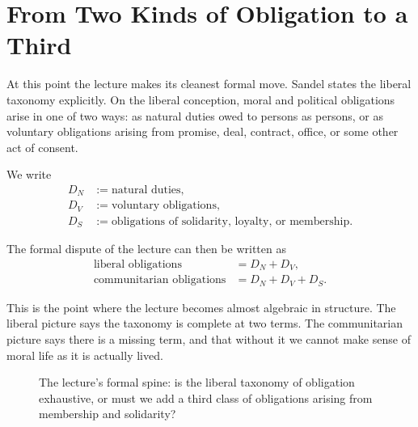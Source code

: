 \section{From Two Kinds of Obligation to a Third}

At this point the lecture makes its cleanest formal move. Sandel states the liberal taxonomy explicitly. On the liberal conception, moral and political obligations arise in one of two ways: as natural duties owed to persons as persons, or as voluntary obligations arising from promise, deal, contract, office, or some other act of consent.

\begin{definition}
We write
\begin{align}
D_N &:= \text{natural duties}, \\
D_V &:= \text{voluntary obligations}, \\
D_S &:= \text{obligations of solidarity, loyalty, or membership}.
\end{align}
\end{definition}

The formal dispute of the lecture can then be written as
\begin{align}
\text{liberal obligations} &= D_N + D_V, \\
\text{communitarian obligations} &= D_N + D_V + D_S.
\end{align}

This is the point where the lecture becomes almost algebraic in structure. The liberal picture says the taxonomy is complete at two terms. The communitarian picture says there is a missing term, and that without it we cannot make sense of moral life as it is actually lived.

\begin{figure}[h]
\centering
{}
\caption{The lecture's formal spine: is the liberal taxonomy of obligation exhaustive, or must we add a third class of obligations arising from membership and solidarity?}
\end{figure}

